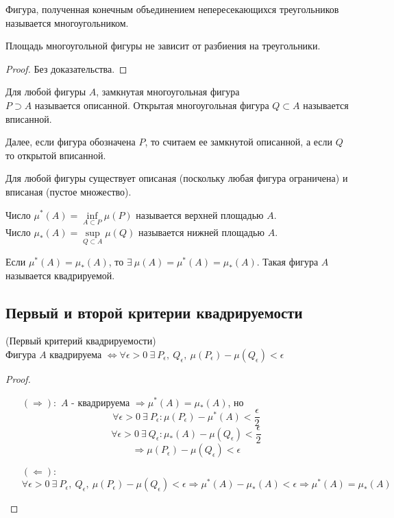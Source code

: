 \begin{definition}
    Фигура, полученная конечным объединением непересекающихся треугольников называется многоугольником.
\end{definition} 
\begin{theorem}
    Площадь многоугольной фигуры не зависит от разбиения на треугольники.
\end{theorem} 
\begin{proof}
    Без доказательства. %
\end{proof} 
\begin{definition}
    Для любой фигуры $A$, замкнутая многоугольная фигура\\
    $P\supset A$ называется описанной. Открытая многоугольная фигура $Q\subset A$ называется вписанной.
\end{definition}
\begin{comm}
    Далее, если фигура обозначена $P$, то считаем ее замкнутой описанной, а если $Q$ то открытой вписанной. 
\end{comm} 
\begin{comm}
    Для любой фигуры существует описаная (поскольку любая фигура ограничена) и вписаная (пустое множество).
\end{comm} 
\begin{definition}
    Число $\mu^*(A)=\inf\limits_{A\subset P}\mu(P)$ называется верхней площадью $A$.\\
    Число $\mu_*(A)=\sup\limits_{Q\subset A}\mu(Q)$ называется нижней площадью $A$.
\end{definition} 
\begin{definition}
    Если $\mu^*(A)=\mu_*(A)$, то $\exists\ \mu(A)=\mu^*(A)=\mu_*(A)$. Такая фигура $A$ называется квадрируемой.
\end{definition} 
\subsection{Первый и второй критерии квадрируемости}
\begin{theorem}
    (Первый критерий квадрируемости)\\
    Фигура $A$ квадрируема $\Leftrightarrow \forall \epsilon>0\ \exists\ P_{\epsilon},\ Q_{\epsilon},\ \mu(P_{\epsilon})-\mu(Q_{\epsilon})<\epsilon$
\end{theorem} 
\begin{proof}\tab
    \begin{itemize}
        \item[$(\Rightarrow):$] $A$ - квадрируема $\Rightarrow \mu^*(A)=\mu_*(A)$, но
        \[\forall \epsilon>0\ \exists\ P_{\epsilon}: \mu(P_{\epsilon})-\mu^*(A)<\frac{\epsilon}{2}\]
        \[\forall \epsilon>0\ \exists\ Q_{\epsilon}: \mu_*(A)-\mu(Q_{\epsilon})<\frac{\epsilon}{2}\]
        \[\Rightarrow \mu(P_\epsilon)-\mu(Q_{\epsilon})<\epsilon\]
        \item[$(\Leftarrow):$] 
        \[\forall \epsilon>0\ \exists\ P_{\epsilon},\ Q_{\epsilon},\ \mu(P_{\epsilon})-\mu(Q_{\epsilon})<\epsilon \Rightarrow \mu^*(A)-\mu_*(A)<\epsilon \Rightarrow \mu^*(A)=\mu_*(A)\]
    \end{itemize}
\end{proof} 
